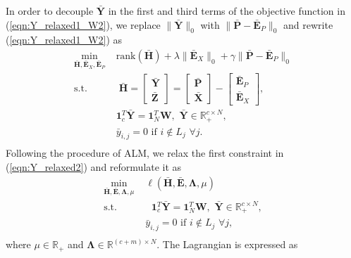 \documentclass[10pt,journal,compsoc]{IEEEtran}
\begin{document}
In order to decouple $\bar{\mathbf{Y}}$ in the first and third terms of the objective function in (\ref{eqn:Y_relaxed1_W2}), we replace
$\|\bar{\mathbf{Y}}\|_0$ with $\|\bar{\mathbf{P}} -\bar{\mathbf{E}}_P\|_0$ and rewrite (\ref{eqn:Y_relaxed1_W2}) as
\begin{equation}
\begin{aligned}
 \min_{\bar{\mathbf{H}}, \bar{\mathbf{E}}_X, \bar{\mathbf{E}}_P} \,\, & \mathrm{rank} (\bar{\mathbf{H}}) + \lambda \|\bar{\mathbf{E}}_X\|_0  +  \gamma \|\bar{\mathbf{P}} -\bar{\mathbf{E}}_P\|_0\\
 \text{s.t.} & \;
{\bar{\mathbf{H}}}= \begin{bmatrix}
\bar{\mathbf{Y}} \\
\bar{\mathbf{Z}}
\end{bmatrix}= \begin{bmatrix}
\bar{\mathbf{P}} \\
\bar{\mathbf{X}}
\end{bmatrix} - \begin{bmatrix}
\bar{\mathbf{E}}_P \\
\bar{\mathbf{E}}_X
\end{bmatrix},\\
& \mathbf{1}^T_c \bar{\mathbf{Y}}  = \mathbf{1}^T_N \mathbf{W}, \,\, \bar{\mathbf{Y}} \in \mathbb{R}_+^{c \times N}, \\
& \bar{y}_{i,j} = 0 \,\, \mathrm{if} \,\, i \notin L_j \,\, \forall j. \\
\end{aligned}\label{eqn:Y_relaxed2}
\end{equation}
Following the procedure of ALM, we relax the first constraint in (\ref{eqn:Y_relaxed2}) and reformulate it as
\begin{equation}
\begin{aligned}
 \min_{\bar{\mathbf{H}},\bar{\mathbf{E}}, \mathbf{\Lambda}, \mu} \,\,& \ell  (\bar{\mathbf{H}},\bar{\mathbf{E}}, \mathbf{\Lambda}, \mu) \\
 \text{s.t.}
&\,\, \; \mathbf{1}^T_c \bar{\mathbf{Y}} = \mathbf{1}^T_N \mathbf{W}, \,\, \bar{\mathbf{Y}} \in \mathbb{R}_+^{c \times N}, \\
& \bar{y}_{i,j} = 0 \,\, \mathrm{if} \,\, i \notin L_j \,\, \forall j, \\
\end{aligned}\label{eqn:Y_relaxed_aug}
\end{equation}
where  $\mu \in \mathbb{R}_+$ and $\mathbf{\Lambda} \in \mathbb{R}^{(c+m) \times N}$.
The Lagrangian is expressed as
\end{document}
